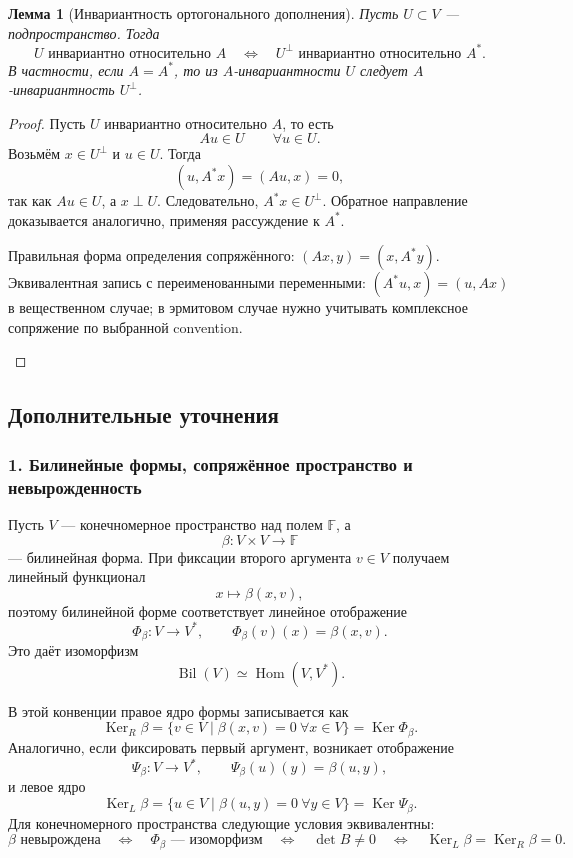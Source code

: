 \documentclass[12pt,a4paper]{article}
\theoremstyle{definition}
\theoremstyle{plain}
\newtheorem{lemma}[definition]{Лемма}
\theoremstyle{remark}
\newenvironment{knowledgefix}{\begin{clarifybox}}{\end{clarifybox}}
\newcommand{\F}{\mathbb{F}}
\newcommand{\Hom}{\operatorname{Hom}}
\newcommand{\Ker}{\operatorname{Ker}}
\begin{document}
\begin{lemma}[Инвариантность ортогонального дополнения]
Пусть $U\subset V$ --- подпространство. Тогда
\[
    U \text{ инвариантно относительно } A
    \quad\Longleftrightarrow\quad
    U^\perp \text{ инвариантно относительно } A^*.
\]
В частности, если $A=A^*$, то из $A$-инвариантности $U$ следует $A$-инвариантность $U^\perp$.
\end{lemma}

\begin{proof}
Пусть $U$ инвариантно относительно $A$, то есть
\[
    Au\in U \qquad \forall u\in U.
\]
Возьмём $x\in U^\perp$ и $u\in U$. Тогда
\[
    (u,A^*x)=(Au,x)=0,
\]
так как $Au\in U$, а $x\perp U$. Следовательно, $A^*x\in U^\perp$.
Обратное направление доказывается аналогично, применяя рассуждение к $A^*$.
\begin{knowledgefix}
Правильная форма определения сопряжённого: \((Ax,y)=(x,A^*y)\). Эквивалентная запись с переименованными переменными: \((A^*u,x)=(u,Ax)\) в вещественном случае; в эрмитовом случае нужно учитывать комплексное сопряжение по выбранной convention.
\end{knowledgefix}
\end{proof}

\subsection*{Дополнительные уточнения}

\subsubsection*{1. Билинейные формы, сопряжённое пространство и невырожденность}
Пусть $V$ --- конечномерное пространство над полем $\F$, а
\[
    \beta:V\times V\to \F
\]
--- билинейная форма. При фиксации второго аргумента $v\in V$ получаем линейный функционал
\[
    x\mapsto \beta(x,v),
\]
поэтому билинейной форме соответствует линейное отображение
\[
    \Phi_\beta:V\to V^*,\qquad
    \Phi_\beta(v)(x)=\beta(x,v).
\]
Это даёт изоморфизм
\[
    \operatorname{Bil}(V)\simeq \Hom(V,V^*).
\]

В этой конвенции правое ядро формы записывается как
\[
    \Ker_R\beta=\{v\in V\mid \beta(x,v)=0\ \forall x\in V\}=\Ker \Phi_\beta.
\]
Аналогично, если фиксировать первый аргумент, возникает отображение
\[
    \Psi_\beta:V\to V^*,\qquad \Psi_\beta(u)(y)=\beta(u,y),
\]
и левое ядро
\[
    \Ker_L\beta=\{u\in V\mid \beta(u,y)=0\ \forall y\in V\}=\Ker\Psi_\beta.
\]
Для конечномерного пространства следующие условия эквивалентны:
\[
    \beta\text{ невырождена}
    \quad\Longleftrightarrow\quad
    \Phi_\beta\text{ --- изоморфизм}
    \quad\Longleftrightarrow\quad
    \det B\ne 0
    \quad\Longleftrightarrow\quad
    \Ker_L\beta=\Ker_R\beta=0.
\]
\end{document}
